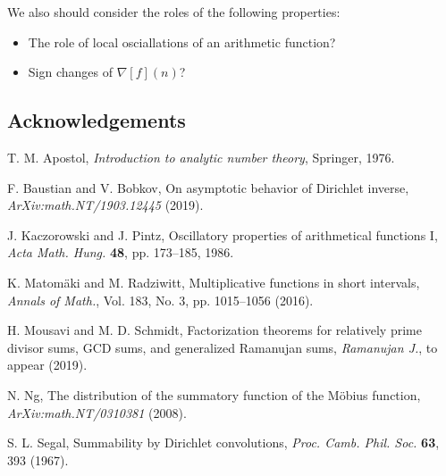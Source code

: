 \documentclass[11pt,reqno]{amsart}
\numberwithin{figure}{section}
\numberwithin{table}{section}
\theoremstyle{plain}
\numberwithin{theorem}{section}
\theoremstyle{definition}
\begin{document}
We also should consider the roles of the following properties: 
\begin{itemize} 

\item The role of local osciallations of an arithmetic function? 
\item Sign changes of $\nabla[f](n)$? 

\end{itemize} 

\subsection*{Acknowledgements} 


\begin{thebibliography}{10} 

T. M. Apostol, \textit{Introduction to analytic number theory}, Springer, 1976. 

F. Baustian and V. Bobkov, On asymptotic behavior of Dirichlet inverse, {\em ArXiv:math.NT/1903.12445} (2019). 

J. Kaczorowski and J. Pintz, Oscillatory properties of arithmetical 
  functions I, \emph{Acta Math. Hung.} {\bf 48}, pp. 173--185, 
  1986. 

K. Matom\"aki and M. Radziwitt, Multiplicative functions in 
  short intervals, \emph{Annals of Math.}, Vol. 183, No. 3, 
  pp. 1015--1056 (2016). 

H. Mousavi and M. D. Schmidt, Factorization theorems for relatively prime 
  divisor sums, GCD sums, and generalized {R}amanujan sums, 
  \emph{Ramanujan J.}, to appear (2019). 

N. Ng, The distribution of the summatory function of the M\"obius function, 
  \emph{ArXiv:math.NT/0310381} (2008). 

S. L. Segal, Summability by Dirichlet convolutions, 
  \emph{Proc. Camb. Phil. Soc.} \textbf{63}, 393 (1967). 

\end{thebibliography} 
\end{document}

